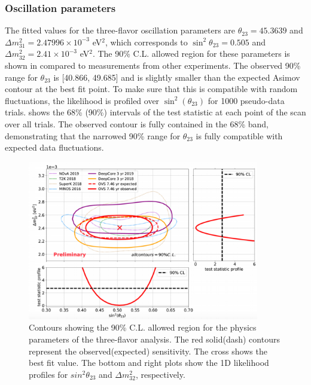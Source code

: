 
\subsubsection{Oscillation parameters}
The fitted values for the three-flavor oscillation parameters are $\theta_{23} = 45.3639$ and $\Delta m^2_{31} = 2.47996 \times10^{-3}$ eV$^2$, which corresponds to $\sin^2\theta_{23} = 0.505$ and $\Delta m^2_{32} = 2.41 \times10^{-3}$ eV$^2$. The 90\% C.L. allowed region for these parameters is shown in  compared to measurements from other experiments. The observed 90\% range for $\theta_{23}$ is [40.866, 49.685] and is slightly smaller than the expected Asimov contour at the best fit point. To make sure that this is compatible with random fluctuations, the likelihood is profiled over $\sin^2(\theta_{23})$ for 1000 pseudo-data trials.  shows the  68\% (90\%) intervals of the test statistic at each point of the scan over all trials. The observed contour is fully contained in the 68\% band, demonstrating that the narrowed 90\% range for $\theta_{23}$ is fully compatible with expected data fluctuations.

\begin{figure}
    \centering
        \includegraphics[width=0.9\textwidth]{figures/measurement/three_flavor/results/real_data_contour.png}  
  \caption{Contours showing the 90\% C.L. allowed region for the physics parameters of the three-flavor analysis. The red solid(dash) contours represent the observed(expected) sensitivity. The cross shows the best fit value. The bottom and right plots show the 1D likelihood profiles for $sin^2\theta_{23}$ and $\Delta m^2_{32}$, respectively. 
  \label{fig:real_data_contour_three_flavor}}
\end{figure}

